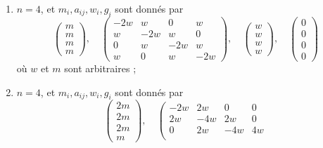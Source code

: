 \begin{lemma}[Genre un]
\begin{enumerate}
$$\begin{matrix}
-4w & 2w & 0 \\
2w & -2w & 2w \\
0 & 2w & -4w
\end{matrix}
\right),
\quad
\left(
\begin{matrix}
2w \\
w \\
2w
\end{matrix}
\right),
\quad
\left(
\begin{matrix}
0 \\
0 \\
0
\end{matrix}
\right)
$$
où $w$ et $m$ sont arbitraires ;
\item
\label{item-four-cycle}
$n = 4$, et $m_i, a_{ij}, w_i, g_i$ sont donnés par
$$
\left(
\begin{matrix}
m \\
m \\
m \\
m
\end{matrix}
\right),
\quad
\left(
\begin{matrix}
-2w & w & 0 & w \\
w & -2w & w & 0 \\
0 & w & -2w & w \\
w & 0 & w & -2w
\end{matrix}
\right),
\quad
\left(
\begin{matrix}
w \\
w \\
w \\
w
\end{matrix}
\right),
\quad
\left(
\begin{matrix}
0 \\
0 \\
0 \\
0
\end{matrix}
\right)
$$
où $w$ et $m$ sont arbitraires ;
\item
\label{item-up-equal-up}
$n = 4$, et $m_i, a_{ij}, w_i, g_i$ sont donnés par
$$
\left(
\begin{matrix}
2m \\
2m \\
2m \\
m
\end{matrix}
\right),
\quad
\left(
\begin{matrix}
-2w & 2w & 0 & 0 \\
2w & -4w & 2w & 0 \\
0 & 2w & -4w & 4w \\

\end{matrix}$$
\end{enumerate}
\end{lemma}
